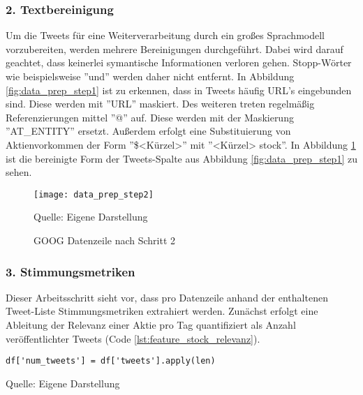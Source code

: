 \subsubsection*{2. Textbereinigung}
Um die Tweets für eine Weiterverarbeitung durch ein großes Sprachmodell vorzubereiten, werden mehrere Bereinigungen durchgeführt. Dabei wird darauf geachtet, dass keinerlei symantische Informationen verloren gehen. Stopp-Wörter wie beispielsweise ''und'' werden daher nicht entfernt.
In Abbildung \ref{fig:data_prep_step1} ist zu erkennen, dass in Tweets häufig URL's eingebunden sind. Diese werden mit ''URL'' maskiert.
Des weiteren treten regelmäßig Referenzierungen mittel ''@'' auf. Diese werden mit der Maskierung ''AT\_ENTITY'' ersetzt. 
Außerdem erfolgt eine Substituierung von Aktienvorkommen der Form ''\$<Kürzel>'' mit ''<Kürzel> stock''. In Abbildung \ref{fig:data_prep_step2} ist die bereinigte Form der Tweets-Spalte aus Abbildung \ref{fig:data_prep_step1} zu sehen.
\begin{figure}[H]
	\caption{GOOG Datenzeile nach Schritt 2}
	\texttt{[image: data\_prep\_step2]}
	\label{fig:data_prep_step2}
	\raggedright
	\normalsize{Quelle: Eigene Darstellung}
	\vspace{-1.0em}
\end{figure}


\subsubsection*{3. Stimmungsmetriken}
Dieser Arbeitsschritt sieht vor, dass pro Datenzeile anhand der enthaltenen Tweet-Liste Stimmungsmetriken extrahiert werden. Zunächst erfolgt eine Ableitung der Relevanz einer Aktie pro Tag quantifiziert als Anzahl veröffentlichter Tweets (Code \ref{lst:feature_stock_relevanz}).
\begin{lstlisting}[caption={Relevanz quantifiziert als Anzahl-Tweets}, label=lst:feature_stock_relevanz, captionpos=t]
df['num_tweets'] = df['tweets'].apply(len)
\end{lstlisting}
\vspace{-1.3em}
\normalsize{Quelle: Eigene Darstellung}

